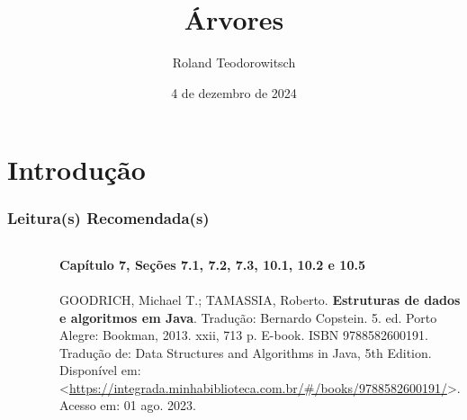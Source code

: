 \documentclass[aspectratio=169]{beamer}
\title[\sc{Árvores}]{Árvores}
\author[Roland Teodorowitsch]{Roland Teodorowitsch}
\institute[ALEST I - EP - PUCRS]{Algoritmos e Estruturas de Dados I - Escola Politécnica - PUCRS}
\date{4 de dezembro de 2024}
\begin{document}
\justifying

\begin{frame}
	\titlepage
\end{frame}

\section{Introdução}

\begin{frame}\frametitle{Leitura(s) Recomendada(s)}

\begin{columns}[T]
\begin{column}{0.15\linewidth}
\vspace{-3mm}
\begin{figure}[h]
	\centering
	\includegraphics[height=0.3\paperheight]{imagens/livro_goodrich.jpg}
\end{figure}
\end{column}
\begin{column}{0.85\linewidth}
\tiny{\textbf{Capítulo 7, Seções 7.1, 7.2, 7.3, 10.1, 10.2 e 10.5}\\
~}\\
\scriptsize{GOODRICH, Michael T.; TAMASSIA, Roberto. \textbf{Estruturas de dados e algoritmos em Java}. Tradução: Bernardo Copstein. 5. ed. Porto Alegre: Bookman, 2013. xxii, 713 p. E-book. ISBN 9788582600191. Tradução de: Data Structures and Algorithms in Java, 5th Edition. Disponível em: \textless{}\url{https://integrada.minhabiblioteca.com.br/\#/books/9788582600191/}\textgreater{}. Acesso em: 01 ago. 2023.}
\end{column}
\end{columns}

\end{frame}

\end{document}
